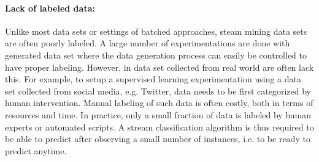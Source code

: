 \paragraph{Lack of labeled data:}
Unlike most data sets or settings of batched approaches, steam mining data sets are often poorly labeled. A large number of experimentations are done with generated data set where the data generation process can easily be controlled to have proper labeling. However, in data set collected from real world are often lack this. For example, to setup a supervised learning experimentation using a data set collected from social media, e.g. Twitter, data needs to be first categorized by human intervention. Manual labeling of such data is often costly, both in terms of resources and time. In practice, only a small fraction of data is labeled by human experts or automated scripts. A stream classification algorithm is thus required to be able to predict after observing a small number of instances, i.e. to be ready to predict anytime.

